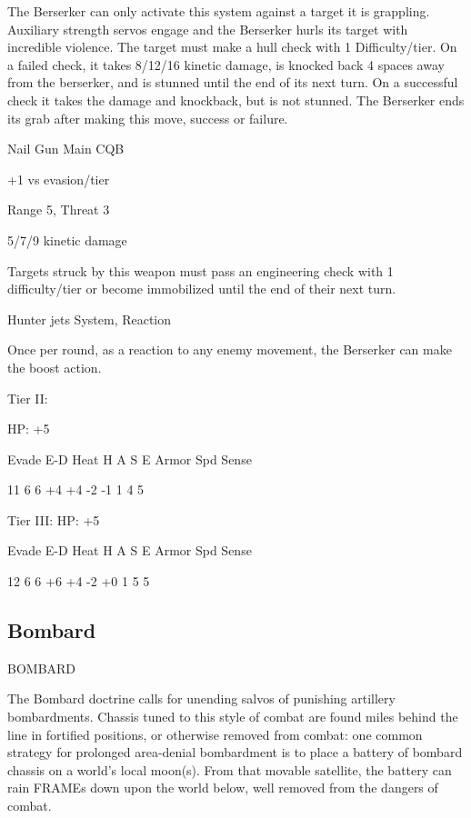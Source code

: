 The Berserker can only activate this system against a target it is grappling. Auxiliary strength  
servos engage and the Berserker hurls its target with incredible violence. The target must make a  
hull check with 1 Difficulty/tier. On a failed check, it takes 8/12/16 kinetic damage, is knocked  
back 4 spaces away from the berserker, and is stunned until the end of its next turn. On a  
successful check it takes the damage and knockback, but is not stunned. The Berserker ends its  
grab after making this move, success or failure.
 

Nail Gun  
Main CQB
 
+1 vs evasion/tier
 
Range 5, Threat 3
 
5/7/9 kinetic damage
 
Targets struck by this weapon must pass an engineering check with 1 difficulty/tier or become  
immobilized until the end of their next turn.
 

Hunter jets  
System, Reaction
 
Once per round, as a reaction to any enemy movement, the Berserker can make the boost  
action.
 

Tier II:
 
HP: +5
 

          Evade     E-D    Heat    H    A     S     E       Armor        Spd       Sense 

          11       6      6        +4   +4    -2    -1       1           4         5 

Tier III:  
HP: +5
 

          Evade     E-D    Heat    H    A     S     E       Armor        Spd       Sense 

          12       6      6        +6   +4    -2    +0       1           5         5 

                                                                                                                
\subsection{Bombard}

                                             BOMBARD  

The Bombard doctrine calls for unending salvos of punishing artillery bombardments. Chassis  
tuned to this style of combat are found miles behind the line in fortified positions, or otherwise  
removed from combat: one common strategy for prolonged area-denial bombardment is to place  
a battery of bombard chassis on a world’s local moon(s). From that movable satellite, the battery  
can rain FRAMEs down upon the world below, well removed from the dangers of combat. 
 

